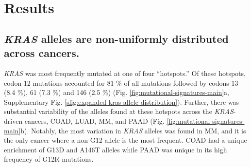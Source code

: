 \documentclass[english, 12pt, letterpaper]{article}
\newcommand{\KRAS}{\emph{KRAS}}
\begin{document}




\section*{Results}

\subsection*{\KRAS{} alleles are non-uniformly distributed across cancers.}

\KRAS{} was most frequently mutated at one of four “hotspots.” 
Of these hotspots, codon 12 mutations accounted for 81 \% of all mutations followed by codons 13 (8.4 \%), 61 (7.3 \%) and 146 (2.5 \%) (Fig. \ref{fig:mutational-signatures-main}a, Supplementary Fig. \ref{sfig:expanded-kras-allele-distribution}). 
Further, there was substantial variability of the alleles found at these hotspots across the \KRAS{}-driven cancers, COAD, LUAD, MM, and PAAD (Fig. \ref{fig:mutational-signatures-main}b). 
Notably, the most variation in \KRAS{} alleles was found in MM, and it is the only cancer where a non-G12 allele is the most frequent. 
COAD had a unique enrichment of G13D and A146T alleles while PAAD was unique in its high frequency of G12R mutations.
\end{document}
